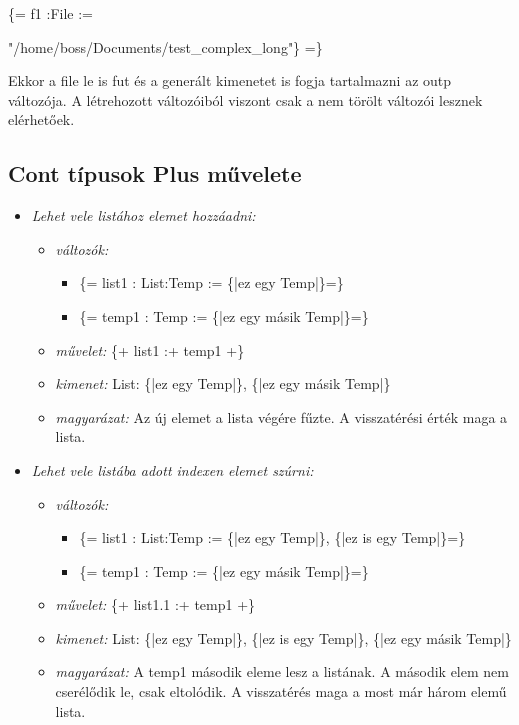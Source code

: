 \{= f1 :File := {"/home/boss/Documents/test\_complex\_long"\} =\}

Ekkor a file le is fut és a generált kimenetet is fogja tartalmazni az outp változója.
A létrehozott változóiból viszont csak a nem törölt változói lesznek elérhetőek.



\subsection{Cont típusok Plus művelete}
\label{sec:SContPlus}
\begin{itemize}
\item \emph{Lehet vele listához elemet hozzáadni:}
\begin{itemize}
\item \emph{változók:}
\begin{itemize}
\item \{= list1 : List:Temp := \{|ez egy Temp|\}=\}
\item \{= temp1 : Temp := \{|ez egy másik Temp|\}=\}
\end{itemize}
\item \emph{művelet:}
\{+ list1 :+ temp1 +\}
\item \emph{kimenet:}
List: \{|ez egy Temp|\}, \{|ez egy másik Temp|\}
\item \emph{magyarázat:}
Az új elemet a lista végére fűzte. 
A visszatérési érték maga a lista.
\end{itemize}

\item \emph{Lehet vele listába adott indexen elemet szúrni:}
\begin{itemize}
\item \emph{változók:}
\begin{itemize}
\item \{= list1 : List:Temp := \{|ez egy Temp|\}, \{|ez is egy Temp|\}=\}
\item \{= temp1 : Temp := \{|ez egy másik Temp|\}=\}
\end{itemize}
\item \emph{művelet:}
\{+ list1.1 :+ temp1 +\}
\item \emph{kimenet:}
List: \{|ez egy Temp|\}, \{|ez is egy Temp|\}, \{|ez egy másik Temp|\}
\item \emph{magyarázat:}
A temp1 második eleme lesz a listának.
A második elem nem cserélődik le, csak eltolódik.
A visszatérés maga a most már három elemű lista.
\end{itemize}


\end{itemize}}
